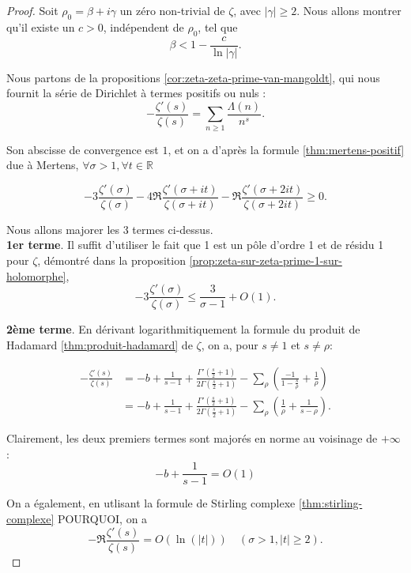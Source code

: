 \documentclass[french]{report}
\begin{document}
\begin{proof}
  Soit $\rho_0=\beta+i\gamma$ un zéro non-trivial de $\zeta$, avec $|\gamma|\geq2$. Nous allons montrer qu'il existe un $c>0$, indépendent de $\rho_0$, tel que 
  \[ \beta<1-\frac{c}{\ln|\gamma|}. \]

  Nous partons de la propositions \ref{cor:zeta-zeta-prime-van-mangoldt}, qui nous fournit la série de Dirichlet à termes positifs ou nuls :
  \[ -\frac{\zeta'(s)}{\zeta(s)} = \sum_{n\geq1}\frac{\Lambda(n)}{n^s}. \]

  Son abscisse de convergence est $1$, et on a d'après la formule \ref{thm:mertens-positif} due à Mertens, $\forall\sigma>1, \forall t\in\mathbb{R}$

 \begin{equation}\label{eq:mertens-zeta-zeta-prime}
  - 3\frac{\zeta'(\sigma)}{\zeta(\sigma)}
  - 4\Re\frac{\zeta'(\sigma+it)}{\zeta(\sigma+it)}
  - \Re\frac{\zeta'(\sigma+2it)}{\zeta(\sigma+2it)}
  \geq0.
 \end{equation}

  Nous allons majorer les 3 termes ci-dessus.
  \\

  \textbf{1er terme}. Il suffit d'utiliser le fait que 1 est un pôle d'ordre 1 et de résidu 1 pour $\zeta$, démontré dans la  proposition \ref{prop:zeta-sur-zeta-prime-1-sur-holomorphe},
  \[ -3\frac{\zeta'(\sigma)}{\zeta(\sigma)} \leq \frac{3}{\sigma-1} + O(1). \]

  \textbf{2ème terme}. En dérivant logarithmitiquement la formule du produit de Hadamard \ref{thm:produit-hadamard} de $\zeta$, on a, pour $s\neq1$ et $s\neq\rho$:

  \begin{align*}
    -\frac{\zeta'(s)}{\zeta(s)}
    &= -b + \frac{1}{s-1}
    + \frac{\Gamma'(\frac{s}{2}+1)}{2\Gamma(\frac{s}{2}+1)}
    - \sum_{\rho}\left(\frac{-1}{1-\frac{s}{\rho}} + \frac{1}{\rho}\right) \\
    &= -b + \frac{1}{s-1}
    + \frac{\Gamma'(\frac{s}{2}+1)}{2\Gamma(\frac{s}{2}+1)}
    - \sum_{\rho}\left(\frac{1}{\rho} + \frac{1}{s-\rho} \right).
  \end{align*}

  Clairement, les deux premiers termes sont majorés en norme au voisinage de $+\infty$ :
  \[ -b + \frac{1}{s-1} = O(1) \]

  On a également, en utlisant la formule de Stirling complexe \ref{thm:stirling-complexe} POURQUOI, on a
  \[ -\Re\frac{\zeta'(s)}{\zeta(s)} = O(\ln(|t|))\quad(\sigma>1, |t|\geq2). \]


\end{proof}
\end{document}
